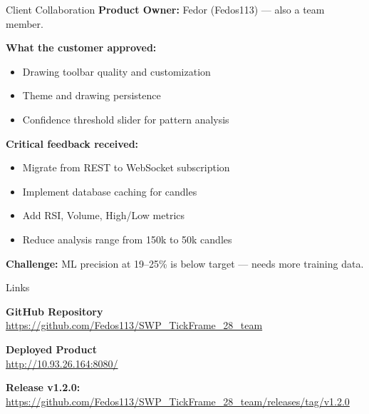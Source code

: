 \documentclass[11pt]{beamer}
\begin{document}
\begin{frame}{Client Collaboration}
    \textbf{Product Owner:} Fedor (Fedos113) --- also a team member.

    \vspace{0.3cm}
    \textbf{What the customer approved:}
    \begin{itemize}
        \item Drawing toolbar quality and customization
        \item Theme and drawing persistence
        \item Confidence threshold slider for pattern analysis
    \end{itemize}

    \vspace{0.3cm}
    \textbf{Critical feedback received:}
    \begin{itemize}
        \item Migrate from REST to WebSocket subscription
        \item Implement database caching for candles
        \item Add RSI, Volume, High/Low metrics
        \item Reduce analysis range from 150k to 50k candles
    \end{itemize}

    \vspace{0.3cm}
    \textbf{Challenge:} ML precision at 19--25\% is below target --- needs more training data.
\end{frame}

\begin{frame}{Links}
    \centering

    \textbf{GitHub Repository} \\
    \url{https://github.com/Fedos113/SWP_TickFrame_28_team} \\
    \vspace{0.2cm}

    \vspace{0.4cm}

    \textbf{Deployed Product} \\
    \url{http://10.93.26.164:8080/} \\
    \vspace{0.2cm}

    \vspace{0.4cm}
    \textbf{Release v1.2.0:} \\
    \url{https://github.com/Fedos113/SWP_TickFrame_28_team/releases/tag/v1.2.0}
\end{frame}
\end{document}
